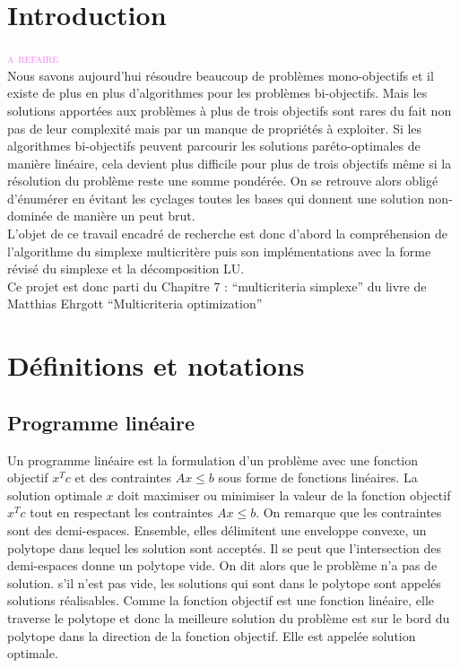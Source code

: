 \documentclass[a4paper,10pt]{article}
\newcommand{\arthur}[1]{\textcolor{violet}{\textsc{#1}}}
\theoremstyle{plain}
\begin{document}
\section{Introduction}\arthur{a refaire\\}
Nous savons aujourd'hui résoudre beaucoup de problèmes mono-objectifs et il existe de plus en plus d'algorithmes pour les problèmes bi-objectifs. Mais les solutions apportées aux problèmes à plus de trois objectifs sont rares du fait non pas de leur complexité mais par un manque de propriétés à exploiter. Si les algorithmes bi-objectifs peuvent parcourir les solutions paréto-optimales de manière linéaire, cela devient plus difficile pour plus de trois objectifs même si la résolution du problème reste une somme pondérée. On se retrouve alors obligé d'énumérer en évitant les cyclages toutes les bases qui donnent une solution non-dominée de manière un peut brut.\\
L'objet de ce travail encadré de recherche est donc d'abord la compréhension de l'algorithme du simplexe multicritère puis son implémentations avec la forme révisé du simplexe et la décomposition LU.\\
Ce projet est donc parti du Chapitre 7 : ``multicriteria simplexe'' du livre de Matthias Ehrgott ``Multicriteria optimization'' \cite{ehrgott2005multicriteria} 

\section{Définitions et notations}
\subsection{Programme linéaire}
Un programme linéaire est la formulation d'un problème avec une fonction objectif $x^Tc$ et des contraintes $Ax\leq b$ sous forme de fonctions linéaires. La solution optimale $x$ doit maximiser ou minimiser la valeur de la fonction objectif $x^Tc$ tout en respectant les contraintes $Ax\leq b$. On remarque que les contraintes sont des demi-espaces. Ensemble, elles délimitent une enveloppe convexe, un polytope dans lequel les solution sont acceptés. Il se peut que l'intersection des demi-espaces donne un polytope vide. On dit alors que le problème n'a pas de solution. s'il n'est pas vide, les solutions qui sont dans le polytope sont appelés solutions réalisables. Comme la fonction objectif est une fonction linéaire, elle traverse le polytope et donc la meilleure solution du problème est sur le bord du polytope dans la direction de la fonction objectif. Elle est appelée solution optimale.
\end{document}
